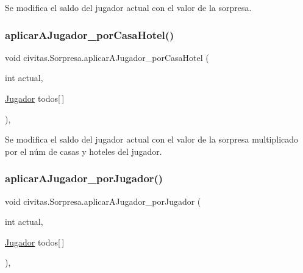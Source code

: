 Se modifica el saldo del jugador actual con el valor de la sorpresa. \mbox{\label{classcivitas_1_1Sorpresa_a5f754dc853619e2aade301acda290784}} 
\subsubsection{\texorpdfstring{aplicar\+A\+Jugador\+\_\+por\+Casa\+Hotel()}{aplicarAJugador\_porCasaHotel()}}
{\footnotesize\ttfamily void civitas.\+Sorpresa.\+aplicar\+A\+Jugador\+\_\+por\+Casa\+Hotel (\begin{DoxyParamCaption}\item[{int}]{actual,  }\item[{\hyperlink{classcivitas_1_1Jugador}{Jugador}}]{todos\mbox{[}$\,$\mbox{]} }\end{DoxyParamCaption})\hspace{0.3cm}{\ttfamily [inline]}, {\ttfamily [private]}}

Se modifica el saldo del jugador actual con el valor de la sorpresa multiplicado por el núm de casas y hoteles del jugador. \mbox{\label{classcivitas_1_1Sorpresa_ac1c1770b07805390c5d7486f6f1285d9}} 
\subsubsection{\texorpdfstring{aplicar\+A\+Jugador\+\_\+por\+Jugador()}{aplicarAJugador\_porJugador()}}
{\footnotesize\ttfamily void civitas.\+Sorpresa.\+aplicar\+A\+Jugador\+\_\+por\+Jugador (\begin{DoxyParamCaption}\item[{int}]{actual,  }\item[{\hyperlink{classcivitas_1_1Jugador}{Jugador}}]{todos\mbox{[}$\,$\mbox{]} }\end{DoxyParamCaption})\hspace{0.3cm}{\ttfamily [inline]}, {\ttfamily [private]}}

